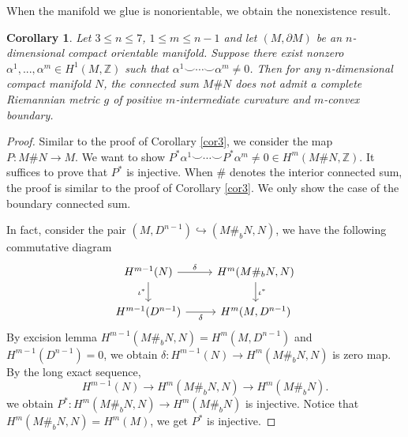 \documentclass[11pt,letterpaper]{amsart}
\newtheorem{corollary}[theorem]{Corollary}
\theoremstyle{definition}
\theoremstyle{remark}
\numberwithin{equation}{section}
\begin{document}
 When the manifold we glue is nonorientable, we obtain the nonexistence result.
\begin{corollary}\label{cor2}
    Let $3\leq n\leq 7$, $1\leq m\leq n-1$ and let $(M,\partial M)$ be an $n$-dimensional compact orientable manifold. Suppose there exist nonzero $  \alpha^{1},...,\alpha^{m}\in H^{1}(M,\mathbb{Z})$ such that $\alpha^{1}\smile\cdots\smile \alpha^{m}\neq 0$. Then for any $n$-dimensional compact manifold $N$, the connected sum $M\# N$ does not admit a complete Riemannian metric $g$ of positive $m$-intermediate curvature and $m$-convex boundary.
\end{corollary}
\begin{proof}
    Similar to the proof of Corollary \ref{cor3}, we consider the map $P:M\#N\rightarrow M$. We want to show $P^*\alpha^{1}\smile \cdots \smile P^{*}\alpha^{m}\neq 0\in H^{m}(M\#N,\mathbb{Z})$. It suffices to prove that $P^*$ is injective. When $\#$ denotes the interior connected sum, the proof is similar to the proof of Corollary \ref{cor3}. We only show the case of the boundary connected sum.  
      

    In fact, consider the pair $(M,D^{n-1})\hookrightarrow(M\#_{b}N,N)$, we have the following commutative diagram
    \[
    \begin{tikzcd}
    H^{m-1}(N) \arrow[r, "\delta"] \arrow[d, swap, "\iota^{*}"] & H^{m}(M\#_{b}N,N) \arrow[d, "\iota^{*}"] \\
    H^{m-1}(D^{n-1}) \arrow[r, swap, "\delta"] & H^{m}(M,D^{n-1})
    \end{tikzcd}
    \]
 By excision lemma $H^{m-1}(M\#_{b}N,N)=H^{m}(M,D^{n-1})$ and $H^{m-1}(D^{n-1})=0$, we obtain $\delta:H^{m-1}(N)\rightarrow H^{m}(M\#_{b}N,N)$ is zero map. By the long exact sequence,
\[
    H^{m-1}(N)\rightarrow H^{m}(M\#_{b}N,N)\rightarrow H^{m}(M\#_{b}N).
\]
we obtain $P^{*}:H^{m}(M\#_{b}N,N)\rightarrow H^{m}(M\#_{b} N)$ is injective. Notice that $H^{m}(M\#_{b}N,N) = H^{m}(M)$, we get $P^{*}$ is injective.
\end{proof}
\end{document}
